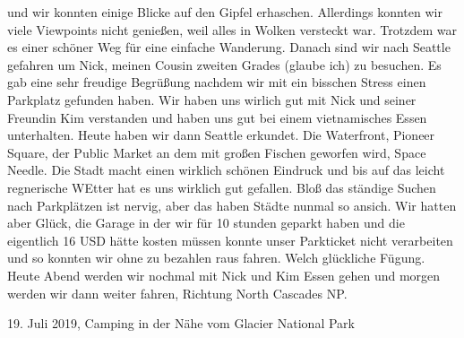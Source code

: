 \documentclass[11pt]{book}
\begin{document}
und wir konnten einige Blicke auf den Gipfel erhaschen. Allerdings konnten wir viele Viewpoints nicht genießen, weil alles in Wolken versteckt war. Trotzdem war 
es einer schöner Weg für eine einfache Wanderung. Danach sind wir nach Seattle gefahren um Nick, meinen Cousin zweiten Grades (glaube ich) zu besuchen. 
Es gab eine sehr freudige Begrüßung nachdem wir mit ein bisschen Stress einen Parkplatz gefunden haben. Wir haben uns wirlich gut mit Nick und seiner 
Freundin Kim verstanden und haben uns gut bei einem vietnamisches Essen unterhalten. 
Heute haben wir dann Seattle erkundet. Die Waterfront, Pioneer Square, der Public Market an dem mit großen Fischen geworfen wird, Space Needle. Die 
Stadt macht einen wirklich schönen Eindruck und bis auf das leicht regnerische WEtter hat es uns wirklich gut gefallen. Bloß das ständige Suchen nach Parkplätzen 
ist nervig, aber das haben Städte nunmal so ansich. Wir hatten aber Glück, die Garage in der wir für 10 stunden geparkt haben und die eigentlich 16 USD 
hätte kosten müssen konnte unser Parkticket nicht verarbeiten und so konnten wir ohne zu bezahlen raus fahren. Welch glückliche Fügung. Heute 
Abend werden wir nochmal mit Nick und Kim Essen gehen und morgen werden wir dann weiter fahren, Richtung North Cascades NP.


19. Juli 2019, Camping in der Nähe vom Glacier National Park
\end{document}
